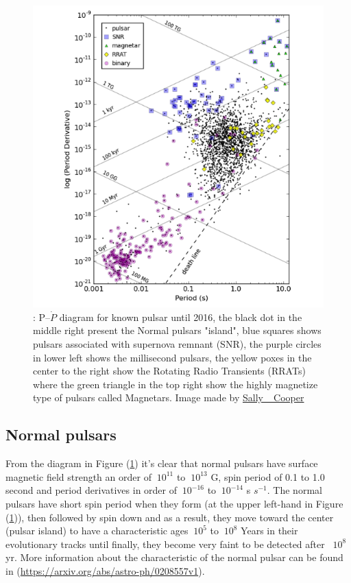\begin{figure}[H] 
\centering    
\includegraphics[width=1.0\textwidth]{sallycooper.png}
\caption[P--$\dot{P}$ Diagram]{: P--$\dot{P}$ diagram for known pulsar until 2016, the black dot in the middle right present the Normal pulsars "island", blue squares shows pulsars associated with supernova remnant (SNR), the purple circles in lower left shows the millisecond pulsars, the yellow poxes in the center to the right show the Rotating Radio Transients (RRATs) where the green triangle in the top right show the highly magnetize type of pulsars called Magnetars. Image made by \url{Sally_ Cooper}}
\label{fig:pp}
\end{figure}


\subsection{Normal pulsars}
\label{Normal Pulsars}
From the diagram in Figure (\ref{fig:pp}) it's clear that normal pulsars have surface magnetic field strength an order of $~10^{11}$ to $~10^{13}$ G, spin period of 0.1 to 1.0 second and period derivatives in order of $~10^{-16}$ to $~10^{-14}$ s $s^{-1}$. The normal pulsars have short spin period when they form (at the upper left-hand in Figure (\ref{fig:pp})), then followed by spin down and as a result, they move  toward the center (pulsar island) to have a characteristic ages $~10^{5}$ to $~10^{8}$ Years in their evolutionary tracks until finally, they become very faint to be detected after ~$10^{8}$ yr. More information about the characteristic of the normal pulsar can be found in (\url{https://arxiv.org/abs/astro-ph/0208557v1}).  

